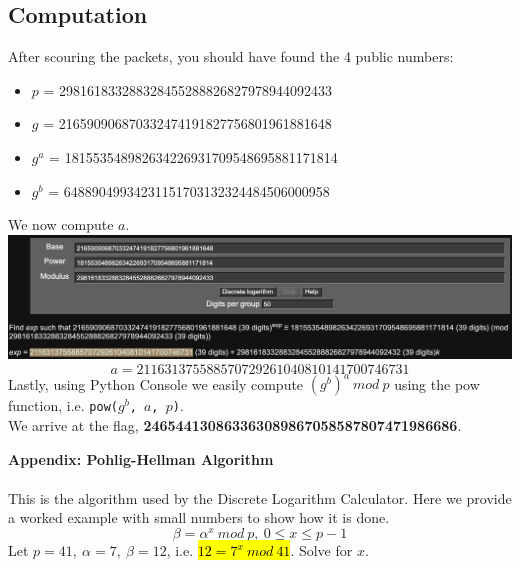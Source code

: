 \documentclass{article}
\begin{document}
	\subsection{Computation}
	After scouring the packets, you should have found the 4 public numbers:
	\begin{itemize}
		\item $p$ = 298161833288328455288826827978944092433
		\item $g$ = 216590906870332474191827756801961881648
		\item $g^a$ = 181553548982634226931709548695881171814
		\item $g^b$ = 64889049934231151703132324484506000958
	\end{itemize}
	We now compute $a$.\\
	
\includegraphics[width=\textwidth,height=\textheight,keepaspectratio]{dilog}\\
\[
a=211631375588570729261040810141700746731
\]
Lastly, using Python Console we easily compute $(g^b)^a\ mod\ p$ using the pow function, i.e. \texttt{pow($g^b$, $a$, $p$)}.\\ We arrive at the flag, \textbf{246544130863363089867058587807471986686}.

\newpage
\textbf{\LARGE{Appendix: Pohlig-Hellman Algorithm}}
\\
\\
This is the algorithm used by the Discrete Logarithm Calculator. Here we provide a worked example with small numbers to show how it is done.
\[
\beta=\alpha^x\ mod\ p,\ 0\leq x\leq p-1
\]
Let $p=41,\ \alpha=7,\ \beta=12$, i.e. \hl{$12=7^x\ mod\ 41$}. Solve for $x$.
\end{document}
